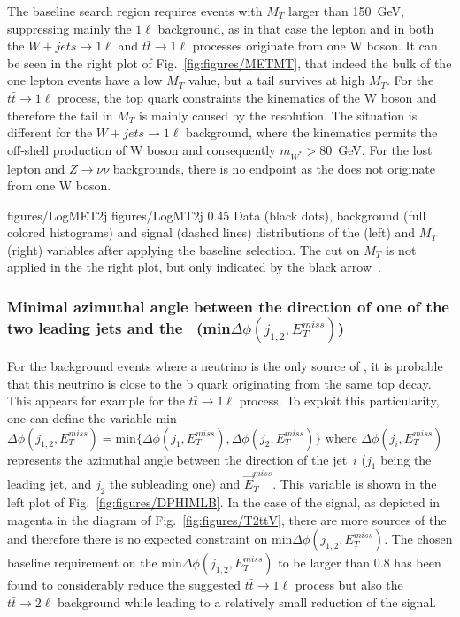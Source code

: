 The baseline search region requires events with $M_{T}$ larger than 150~GeV, suppressing mainly the $1 \ell$ background, as in that case the lepton and \MET in both the  $W+jets \to 1\ell$  and $t \bar{t} \to 1\ell$ processes originate from one W boson.  It can be seen in the right plot of Fig.~\ref{fig:figures/METMT}, that indeed the bulk of the one lepton events have a low $M_{T}$ value, but a tail survives at high $M_{T}$. For the $t \bar{t} \to 1\ell$ process, the top quark constraints the kinematics of the W boson and therefore the tail in $M_{T}$  is mainly caused by the \MET resolution. The situation is different for the $W+jets \to 1\ell$ background, where the kinematics permits the off-shell production of W boson and consequently $m_{W^{*}}> 80$~GeV. For the lost lepton and $Z \to \nu \bar{\nu}$ backgrounds, there is no endpoint as the \MET does not originate from one W boson.

                 {figures/LogMET2j} %
                 {figures/LogMT2j} %
                 {0.45}       %
                 { Data (black dots), background (full colored histograms) and signal (dashed lines) distributions of the \MET (left) and $M_{T}$ (right) variables after applying the baseline selection. The cut on $M_{T}$ is not applied in the the right plot, but only indicated by the black arrow~\cite{website:stopSupp}. }

\subsubsection{Minimal azimuthal angle between the direction of one of the two leading jets and the \MET~(min$\Delta \phi (j_{1,2}, E_{T}^{miss})$)}

For the background events where a neutrino is the only source of \MET, it is probable that this neutrino is close to the b quark  originating from the same top decay. This appears for example for the $t\bar{t} \to 1\ell$ process. To exploit this particularity, one can define the variable min$\Delta \phi (j_{1,2}, E_{T}^{miss}) = \mathrm{min} \{ \Delta \phi (j_{1}, E_{T}^{miss}), \Delta \phi (j_{2}, E_{T}^{miss}) \} $ where $\Delta \phi (j_{i}, E_{T}^{miss})$ represents the azimuthal angle between the direction of the jet~$i$ ($j_{1}$ being the leading jet, and $j_{2}$ the subleading one) and $\vec{E}_{T}^{miss}$. This variable is shown in the left plot of Fig.~\ref{fig:figures/DPHIMLB}. In the case of the signal, as depicted in magenta in the diagram of Fig.~\ref{fig:figures/T2ttV}, there are more sources of the \MET and therefore there is no expected constraint on min$\Delta \phi (j_{1,2}, E_{T}^{miss})$. The chosen baseline requirement on the min$\Delta \phi (j_{1,2}, E_{T}^{miss})$ to be larger than 0.8 has been found to considerably reduce the suggested $t\bar{t} \to 1\ell$ process but also the $t\bar{t} \to 2\ell$  background while leading to a relatively small reduction of the signal.


